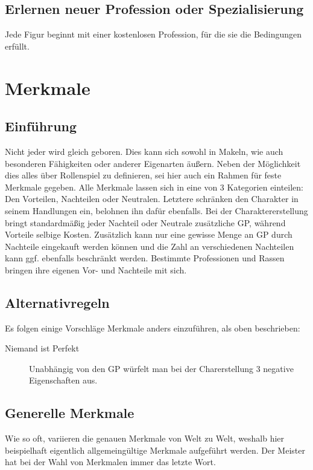 \documentclass[a4paper,12pt,oneside]{book}
\begin{document}
\section{Erlernen neuer Profession oder Spezialisierung}
Jede Figur beginnt mit einer kostenlosen Profession, für die sie die Bedingungen erfüllt.  

\chapter{Merkmale}
\section{Einführung}
Nicht jeder wird gleich geboren. Dies kann sich sowohl in Makeln, wie auch besonderen Fähigkeiten oder anderer Eigenarten äußern. Neben der Möglichkeit dies alles über Rollenspiel zu definieren, sei hier auch ein Rahmen für feste Merkmale gegeben. Alle Merkmale lassen sich in eine von 3 Kategorien einteilen: Den Vorteilen, Nachteilen oder Neutralen. Letztere schränken den Charakter in seinem Handlungen ein, belohnen ihn dafür ebenfalls. Bei der Charaktererstellung bringt standardmäßig jeder Nachteil oder Neutrale zusätzliche GP, während Vorteile selbige Kosten. Zusätzlich kann nur eine gewisse Menge an GP durch Nachteile eingekauft werden können und die Zahl an verschiedenen Nachteilen kann ggf. ebenfalls beschränkt werden. Bestimmte Professionen und Rassen bringen ihre eigenen Vor- und Nachteile mit sich.
\section{Alternativregeln}
Es folgen einige Vorschläge Merkmale anders einzuführen, als oben beschrieben:
\begin{description}
\item[Niemand ist Perfekt]Unabhängig von den GP würfelt man bei der Charerstellung 3 negative Eigenschaften aus.
\end{description}
\section{Generelle Merkmale}
Wie so oft, variieren die genauen Merkmale von Welt zu Welt, weshalb hier beispielhaft eigentlich allgemeingültige Merkmale aufgeführt werden. Der Meister hat bei der Wahl von Merkmalen immer das letzte Wort.
\end{document}
